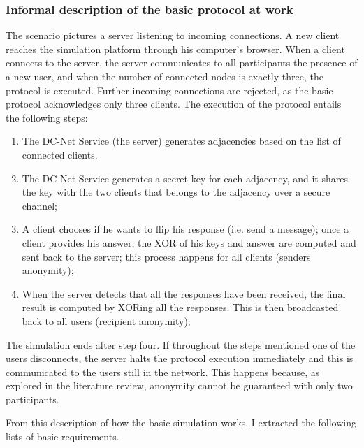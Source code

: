 \subsubsection{Informal description of the basic protocol at work}
The scenario pictures a server listening to incoming connections. A new client reaches the simulation platform through his computer's browser. When a client connects to the server, the server communicates to all participants the presence of a new user, and when the number of connected nodes is exactly three, the protocol is executed. Further incoming connections are rejected, as the basic protocol acknowledges only three clients. The execution of the protocol entails the following steps:
\begin{enumerate}
    \item The DC-Net Service (the server) generates adjacencies based on the list of connected clients.
    \item The DC-Net Service generates a secret key for each adjacency, and it shares the key with the two clients that belongs to the adjacency over a secure channel;
    \item A client chooses if he wants to flip his response (i.e. send a message); once a client provides his answer, the XOR of his keys and answer are computed and sent back to the server; this process happens for all clients (senders anonymity);
    \item When the server detects that all the responses have been received, the final result is computed by XORing all the responses. This is then broadcasted back to all users (recipient anonymity);
\end{enumerate}

The simulation ends after step four. If throughout the steps mentioned one of the users disconnects, the server halts the protocol execution immediately and this is communicated to the users still in the network. This happens because, as explored in the literature review, anonymity cannot be guaranteed with only two participants.

From this description of how the basic simulation works, I extracted the following lists of basic requirements.

